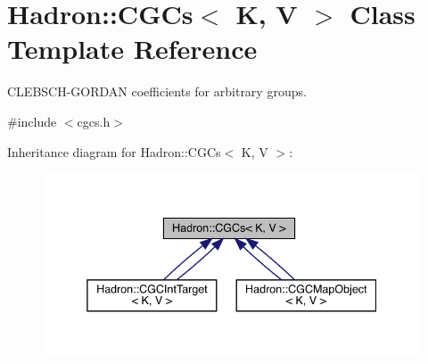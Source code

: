 \hypertarget{classHadron_1_1CGCs}{}\section{Hadron\+:\+:C\+G\+Cs$<$ K, V $>$ Class Template Reference}
\label{classHadron_1_1CGCs}


C\+L\+E\+B\+S\+C\+H-\/\+G\+O\+R\+D\+AN coefficients for arbitrary groups.  




{\ttfamily \#include $<$cgcs.\+h$>$}



Inheritance diagram for Hadron\+:\+:C\+G\+Cs$<$ K, V $>$\+:\nopagebreak
\begin{figure}[H]
\begin{center}
\leavevmode
\includegraphics[width=338pt]{dc/d82/classHadron_1_1CGCs__inherit__graph}
\end{center}
\end{figure}
